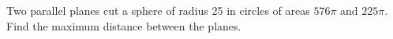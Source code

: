 Two parallel planes cut a sphere of radius 25 in circles of areas $576\pi$ and $225\pi$. Find the maximum distance between the planes.
